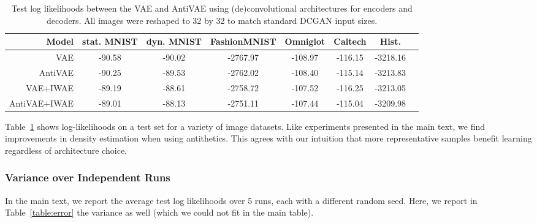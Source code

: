 \begin{table}
\scriptsize
\centering
\begin{tabular}{r|ccccccc}
    Model & stat. MNIST & dyn. MNIST & FashionMNIST & Omniglot & Caltech  & Hist. \\
    \toprule
    VAE & -90.58 & -90.02 & -2767.97 & -108.97 & -116.15 &  -3218.16\\
    AntiVAE & -90.25 & -89.53 & -2762.02 & -108.40 & -115.14 & -3213.83 \\
    VAE+IWAE & -89.19 & -88.61 & -2758.72 & -107.52 & -116.25 & -3213.05 \\
    AntiVAE+IWAE & -89.01 & -88.13 & -2751.11 & -107.44 & -115.04 & -3209.98 \\
\end{tabular}
\caption{Test log likelihoods between the VAE and AntiVAE using (de)convolutional architectures for encoders and decoders. All images were reshaped to 32 by 32 to match standard DCGAN input sizes. }
\label{table:results_conv}
\end{table}

Table~\ref{table:results_conv} shows log-likelihoods on a test set for a variety of image datasets. Like experiments presented in the main text, we find improvements in density estimation when using antithetics. This agrees with our intuition that more representative samples benefit learning regardless of architecture choice.

\subsubsection{Variance over Independent Runs}
In the main text, we report the average test log likelihoods over 5 runs, each with a different random seed. Here, we report in Table~\ref{table:error} the variance as well (which we could not fit in the main table).

